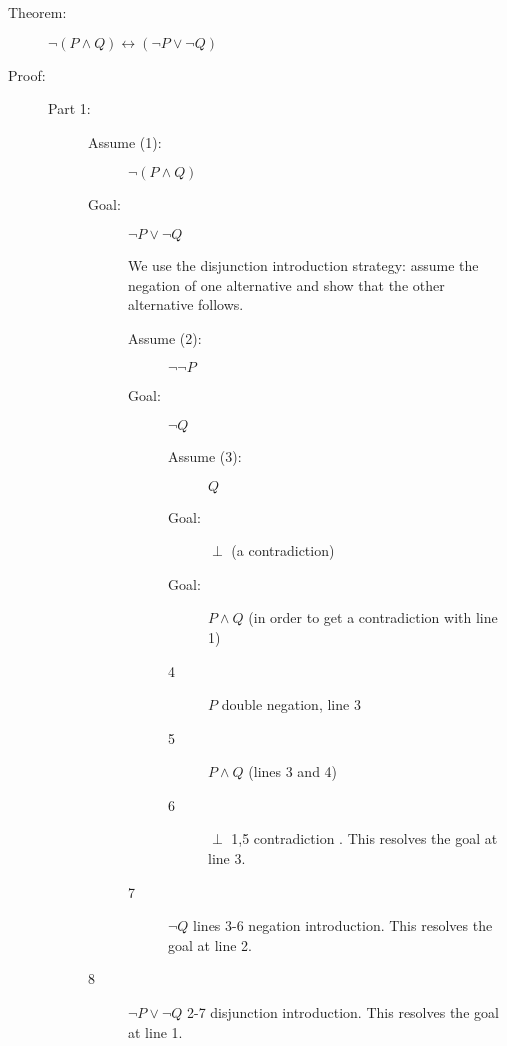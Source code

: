 \documentclass[12pt]{book}
\begin{document}
\begin{description}
\item[Theorem:]  $\neg(P \wedge Q) \leftrightarrow (\neg P \vee \neg Q)$

\item[Proof:]

\begin{description}

\item[Part 1:]

\begin{description}

\item[Assume (1):]  $\neg(P \wedge Q)$

\item[Goal:]  $\neg P \vee \neg Q$

We use the disjunction introduction strategy:  assume the negation of one alternative and show that the other alternative follows.

\begin{description}

\item[Assume (2):]  $\neg\neg P$

\item[Goal:]  $\neg Q$

\begin{description}

\item[Assume (3):]  $Q$

\item[Goal:]  $\perp$ (a contradiction)

\item[Goal:]  $P \wedge Q$ (in order to get a contradiction with line 1)

\item[4]  $P$  double negation, line 3

\item[5]  $P \wedge Q$ (lines 3 and 4)

\item[6]  $\perp$  1,5 contradiction .  This resolves the goal at line 3.

\end{description}

\item[7] $\neg Q$  lines 3-6 negation introduction.  This resolves the goal at line 2.

\end{description}

\item[8]  $\neg P \vee \neg Q$  2-7 disjunction introduction.  This resolves the goal at line 1.



\end{description}
\end{description}
\end{description}
\end{document}

